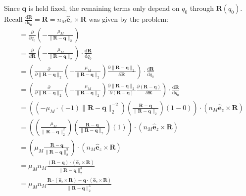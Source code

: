 \documentclass[titlepage]{article}
\begin{document}
Since $\boldsymbol{q}$ is held fixed, the remaining terms only depend on $q_0$ through $\boldsymbol{R}(q_0)$. Recall $\frac{\mathrm{d}\boldsymbol{R}}{\mathrm{d}q_0}=\dot{\boldsymbol{R}}=n_M\hat{\boldsymbol{e}}_z\times\boldsymbol{R}$ was given by the problem:
\begin{equation}
	\begin{split}
		&=\frac{\partial}{\partial q_0}\left(-\frac{\mu_M}{\|\boldsymbol{R}-\boldsymbol{q}\|_2}\right) \\
		&=\frac{\partial}{\partial\boldsymbol{R}}\left(-\frac{\mu_M}{\|\boldsymbol{R}-\boldsymbol{q}\|_2}\right)\cdot\frac{\mathrm{d}\boldsymbol{R}}{\mathrm{d}q_0} \\
		&=\left(\frac{\partial}{\partial\|\boldsymbol{R}-\boldsymbol{q}\|_2}\left(-\frac{\mu_M}{\|\boldsymbol{R}-\boldsymbol{q}\|_2}\right)\frac{\partial\|\boldsymbol{R}-\boldsymbol{q}\|_2}{\partial\boldsymbol{R}}\right)\cdot\frac{\mathrm{d}\boldsymbol{R}}{\mathrm{d}q_0} \\
		&=\left(\frac{\partial}{\partial\|\boldsymbol{R}-\boldsymbol{q}\|_2}\left(-\frac{\mu_M}{\|\boldsymbol{R}-\boldsymbol{q}\|_2}\right)\frac{\partial\|\boldsymbol{R}-\boldsymbol{q}\|_2}{\partial(\boldsymbol{R}-\boldsymbol{q})}\frac{\partial(\boldsymbol{R}-\boldsymbol{q})}{\partial\boldsymbol{R}}\right)\cdot\frac{\mathrm{d}\boldsymbol{R}}{\mathrm{d}q_0} \\
		&=\left(\left(-\mu_M\cdot(-1)\|\boldsymbol{R}-\boldsymbol{q}\|_2^{-2}\right)\left(\frac{\boldsymbol{R}-\boldsymbol{q}}{\|\boldsymbol{R}-\boldsymbol{q}\|_2}\right)\left(1-0\right)\right)\cdot\left(n_M\hat{\boldsymbol{e}}_z\times\boldsymbol{R}\right) \\
		&=\left(\left(\frac{\mu_M}{\|\boldsymbol{R}-\boldsymbol{q}\|_2^2}\right)\left(\frac{\boldsymbol{R}-\boldsymbol{q}}{\|\boldsymbol{R}-\boldsymbol{q}\|_2}\right)\left(1\right)\right)\cdot\left(n_M\hat{\boldsymbol{e}}_z\times\boldsymbol{R}\right) \\
		&=\left(\mu_M\frac{\boldsymbol{R}-\boldsymbol{q}}{\|\boldsymbol{R}-\boldsymbol{q}\|_2^3}\right)\cdot\left(n_M\hat{\boldsymbol{e}}_z\times\boldsymbol{R}\right) \\
		&=\mu_Mn_M\frac{\left(\boldsymbol{R}-\boldsymbol{q}\right)\cdot\left(\hat{\boldsymbol{e}}_z\times\boldsymbol{R}\right)}{\|\boldsymbol{R}-\boldsymbol{q}\|_2^3} \\
		&=\mu_Mn_M\frac{\boldsymbol{R}\cdot\left(\hat{\boldsymbol{e}}_z\times\boldsymbol{R}\right)-\boldsymbol{q}\cdot\left(\hat{\boldsymbol{e}}_z\times\boldsymbol{R}\right)}{\|\boldsymbol{R}-\boldsymbol{q}\|_2^3}
	\end{split}
\end{equation}
\end{document}
